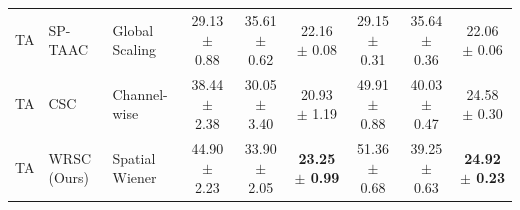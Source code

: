 \documentclass{article}
\theoremstyle{plain}
\theoremstyle{definition}
\theoremstyle{remark}
\begin{document}
\begin{table}[t]
\begin{center}
\begin{scriptsize}
\begin{sc}
\begin{tabular}{lllcccccc}
TA & SP-TAAC & Global Scaling & 29.13 $\pm$ 0.88 & 35.61 $\pm$ 0.62 & 22.16 $\pm$ 0.08 & 29.15 $\pm$ 0.31 & 35.64 $\pm$ 0.36 & 22.06 $\pm$ 0.06 \\
TA & CSC & Channel-wise & 38.44 $\pm$ 2.38 & 30.05 $\pm$ 3.40 & 20.93 $\pm$ 1.19 & 49.91 $\pm$ 0.88 & 40.03 $\pm$ 0.47 & 24.58 $\pm$ 0.30 \\
TA & WRSC (Ours) & Spatial Wiener & 44.90 $\pm$ 2.23 & 33.90 $\pm$ 2.05 & \textbf{23.25 $\pm$ 0.99} & 51.36 $\pm$ 0.68 & 39.25 $\pm$ 0.63 & \textbf{24.92 $\pm$ 0.23} \\
\bottomrule
\end{tabular}
\end{sc}
\end{scriptsize}
\end{center}
\vskip -0.1in
\end{table}
\end{document}

